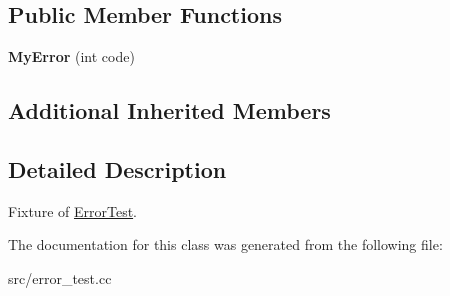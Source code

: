 \subsection*{Public Member Functions}
{\bf }\par
\begin{DoxyCompactItemize}
\item 
\hypertarget{class_my_error_a92df252c67b7a3589f8aba5e7f197eba}{}\label{class_my_error_a92df252c67b7a3589f8aba5e7f197eba} 
{\bfseries My\+Error} (int code)
\end{DoxyCompactItemize}

\subsection*{Additional Inherited Members}


\subsection{Detailed Description}
Fixture of \hyperlink{class_error_test}{Error\+Test}. 

The documentation for this class was generated from the following file\+:\begin{DoxyCompactItemize}
\item 
src/error\+\_\+test.\+cc\end{DoxyCompactItemize}
